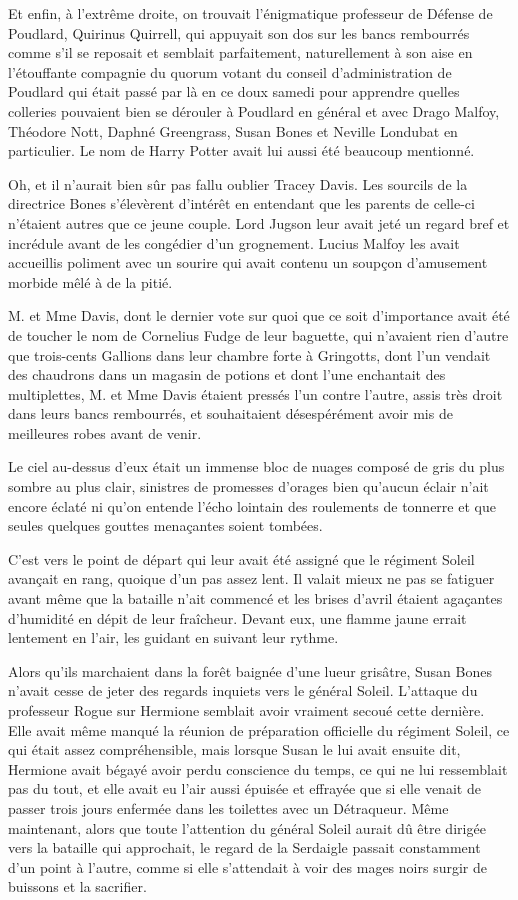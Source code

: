 Et enfin, à l'extrême droite, on trouvait l'énigmatique professeur de Défense de Poudlard, Quirinus Quirrell, qui appuyait son dos sur les bancs rembourrés comme s'il se reposait et semblait parfaitement, naturellement à son aise en l'étouffante compagnie du quorum votant du conseil d'administration de Poudlard qui était passé par là en ce doux samedi pour apprendre quelles colleries pouvaient bien se dérouler à Poudlard en général et avec Drago Malfoy, Théodore Nott, Daphné Greengrass, Susan Bones et Neville Londubat en particulier.
Le nom de Harry Potter avait lui aussi été beaucoup mentionné.

Oh, et il n'aurait bien sûr pas fallu oublier Tracey Davis.
Les sourcils de la directrice Bones s'élevèrent d'intérêt en entendant que les parents de celle-ci n'étaient autres que ce jeune couple.
Lord Jugson leur avait jeté un regard bref et incrédule avant de les congédier d'un grognement.
Lucius Malfoy les avait accueillis poliment avec un sourire qui avait contenu un soupçon d'amusement morbide mêlé à de la pitié.

M. et Mme Davis, dont le dernier vote sur quoi que ce soit d'importance avait été de toucher le nom de Cornelius Fudge de leur baguette, qui n'avaient rien d'autre que trois-cents Gallions dans leur chambre forte à Gringotts, dont l'un vendait des chaudrons dans un magasin de potions et dont l'une enchantait des multiplettes, M. et Mme Davis étaient pressés l'un contre l'autre, assis très droit dans leurs bancs rembourrés, et souhaitaient désespérément avoir mis de meilleures robes avant de venir.

Le ciel au-dessus d'eux était un immense bloc de nuages composé de gris du plus sombre au plus clair, sinistres de promesses d'orages bien qu'aucun éclair n'ait encore éclaté ni qu'on entende l'écho lointain des roulements de tonnerre et que seules quelques gouttes menaçantes soient tombées.

\later

C'est vers le point de départ qui leur avait été assigné que le régiment Soleil avançait en rang, quoique d'un pas assez lent.
Il valait mieux ne pas se fatiguer avant même que la bataille n'ait commencé et les brises d'avril étaient agaçantes d'humidité en dépit de leur fraîcheur.
Devant eux, une flamme jaune errait lentement en l'air, les guidant en suivant leur rythme.

Alors qu'ils marchaient dans la forêt baignée d'une lueur grisâtre, Susan Bones n'avait cesse de jeter des regards inquiets vers le général Soleil.
L'attaque du professeur Rogue sur Hermione semblait avoir vraiment secoué cette dernière.
Elle avait même manqué la réunion de préparation officielle du régiment Soleil, ce qui était assez compréhensible, mais lorsque Susan le lui avait ensuite dit, Hermione avait bégayé avoir perdu conscience du temps, ce qui ne lui ressemblait pas du tout, et elle avait eu l'air aussi épuisée et effrayée que si elle venait de passer trois jours enfermée dans les toilettes avec un Détraqueur.
Même maintenant, alors que toute l'attention du général Soleil aurait dû être dirigée vers la bataille qui approchait, le regard de la Serdaigle passait constamment d'un point à l'autre, comme si elle s'attendait à voir des mages noirs surgir de buissons et la sacrifier.

